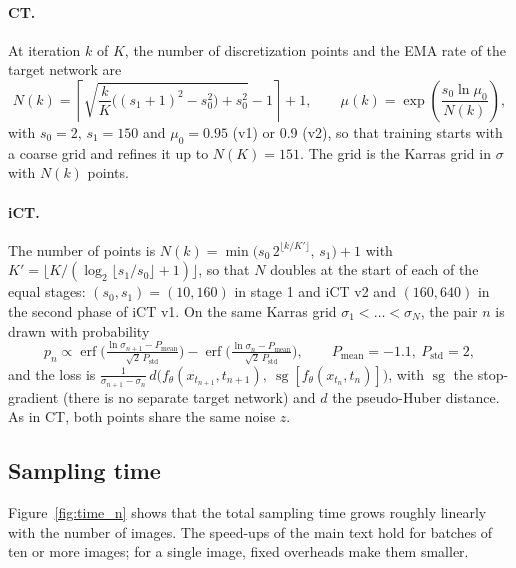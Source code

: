 \documentclass{article}
\begin{document}
\paragraph{CT.} At iteration $k$ of $K$, the number of discretization points
and the EMA rate of the target network are
\begin{equation}
  N(k) = \left\lceil \sqrt{\frac{k}{K}\big((s_1 + 1)^2 - s_0^2\big) + s_0^2} - 1 \right\rceil + 1,
  \qquad \mu(k) = \exp\!\left(\frac{s_0 \ln \mu_0}{N(k)}\right),
\end{equation}
with $s_0 = 2$, $s_1 = 150$ and $\mu_0 = 0.95$ (v1) or 0.9 (v2), so that training starts with a
coarse grid and refines it up to $N(K) = 151$. The grid is the Karras grid in
$\sigma$ with $N(k)$ points.

\paragraph{iCT.} The number of points is
$N(k) = \min\!\big(s_0\, 2^{\lfloor k / K' \rfloor},\, s_1\big) + 1$ with
$K' = \lfloor K / (\log_2\lfloor s_1 / s_0 \rfloor + 1) \rfloor$, so that
$N$ doubles at the start of each of the equal stages: $(s_0, s_1) = (10, 160)$
in stage 1 and iCT v2 and $(160, 640)$ in the second phase of iCT v1. On the same Karras grid
$\sigma_1 < \dots < \sigma_N$, the pair $n$ is drawn with probability
\begin{equation}
  p_n \propto \operatorname{erf}\!\Big(\tfrac{\ln\sigma_{n+1} - P_\text{mean}}{\sqrt{2}\,P_\text{std}}\Big)
  - \operatorname{erf}\!\Big(\tfrac{\ln\sigma_{n} - P_\text{mean}}{\sqrt{2}\,P_\text{std}}\Big),
  \qquad P_\text{mean} = -1.1,\ P_\text{std} = 2,
\end{equation}
and the loss is
$\frac{1}{\sigma_{n+1} - \sigma_n}\, d\big(f_\theta(x_{t_{n+1}}, t_{n+1}),\
\operatorname{sg}[f_\theta(x_{t_n}, t_n)]\big)$, with $\operatorname{sg}$ the
stop-gradient (there is no separate target network) and $d$ the pseudo-Huber
distance. As in CT, both points share the same noise $z$.

\subsection{Sampling time}
\label{sec:app_time}

Figure~\ref{fig:time_n} shows that the total sampling time grows roughly linearly
with the number of images. The speed-ups of the main text hold for batches of ten
or more images; for a single image, fixed overheads make them smaller.
\end{document}

